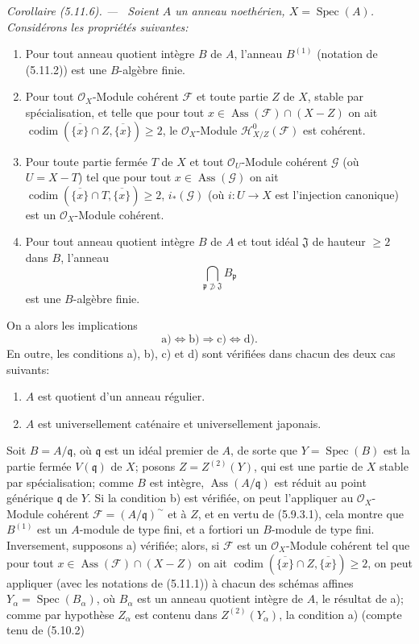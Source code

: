 \documentclass[10pt,oneside]{book}
\newenvironment{corollary}[1][]{%
  \par\medskip\noindent\itshape Corollaire (#1). ---\ }{\par}
\begin{document}
\begin{corollary}[5.11.6]
\label{IV.2.s5.11.6-fr}
Soient $A$ un anneau noethérien, $X=\operatorname{Spec}(A)$. Considérons les
propriétés suivantes:
\begin{enumerate}
\item[a)] Pour tout anneau quotient intègre $B$ de $A$, l'anneau $B^{(1)}$
(notation de (5.11.2)) est une $B$-algèbre finie.
\item[b)] Pour tout $\mathcal O_X$-Module cohérent $\mathcal F$ et toute partie
$Z$ de $X$, stable par spécialisation, et telle que pour tout
$x\in\operatorname{Ass}(\mathcal F)\cap(X-Z)$ on ait
$\operatorname{codim}(\overline{\{x\}}\cap Z,\overline{\{x\}})\geq2$, le
$\mathcal O_X$-Module $\mathcal H^0_{X/Z}(\mathcal F)$ est cohérent.
\item[c)] Pour toute partie fermée $T$ de $X$ et tout $\mathcal O_U$-Module
cohérent $\mathcal G$ (où $U=X-T$) tel que pour tout
$x\in\operatorname{Ass}(\mathcal G)$ on ait
$\operatorname{codim}(\overline{\{x\}}\cap T,\overline{\{x\}})\geq2$,
$i_*(\mathcal G)$ (où $i:U\to X$ est l'injection canonique) est un
$\mathcal O_X$-Module cohérent.
\item[d)] Pour tout anneau quotient intègre $B$ de $A$ et tout idéal
$\mathfrak J$ de hauteur $\geq2$ dans $B$, l'anneau
\[
\bigcap_{\mathfrak p\not\supset\mathfrak J}B_\mathfrak p
\]
est une $B$-algèbre finie.
\end{enumerate}
On a alors les implications
\[
\mathrm a)\Longleftrightarrow\mathrm b)\Longrightarrow\mathrm c)
\Longleftrightarrow\mathrm d).
\]
En outre, les conditions a), b), c) et d) sont vérifiées dans chacun des deux
cas suivants:
\begin{enumerate}
\item[(i)] $A$ est quotient d'un anneau régulier.
\item[(ii)] $A$ est universellement caténaire et universellement japonais.
\end{enumerate}
\end{corollary}

Soit $B=A/\mathfrak q$, où $\mathfrak q$ est un idéal premier de $A$, de sorte
que $Y=\operatorname{Spec}(B)$ est la partie fermée $V(\mathfrak q)$ de $X$;
posons $Z=Z^{(2)}(Y)$, qui est une partie de $X$ stable par spécialisation;
comme $B$ est intègre, $\operatorname{Ass}(A/\mathfrak q)$ est réduit au point
générique $\mathfrak q$ de $Y$. Si la condition b) est vérifiée, on peut
l'appliquer au $\mathcal O_X$-Module cohérent
$\mathcal F=(A/\mathfrak q)^\sim$ et à $Z$, et en vertu de (5.9.3.1), cela
montre que $B^{(1)}$ est un $A$-module de type fini, et a fortiori un
$B$-module de type fini. Inversement, supposons a) vérifiée; alors, si
$\mathcal F$ est un $\mathcal O_X$-Module cohérent tel que pour tout
$x\in\operatorname{Ass}(\mathcal F)\cap(X-Z)$ on ait
$\operatorname{codim}(\overline{\{x\}}\cap Z,\overline{\{x\}})\geq2$, on peut
appliquer (avec les notations de (5.11.1)) à chacun des schémas affines
$Y_\alpha=\operatorname{Spec}(B_\alpha)$, où $B_\alpha$ est un anneau quotient
intègre de $A$, le résultat de a); comme par hypothèse $Z_\alpha$ est contenu
dans $Z^{(2)}(Y_\alpha)$, la condition a) (compte tenu de (5.10.2)
\end{document}

